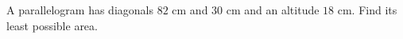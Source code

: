 A parallelogram has diagonals $82$ cm and $30$ cm and an altitude $18$ cm. Find its least possible area.
